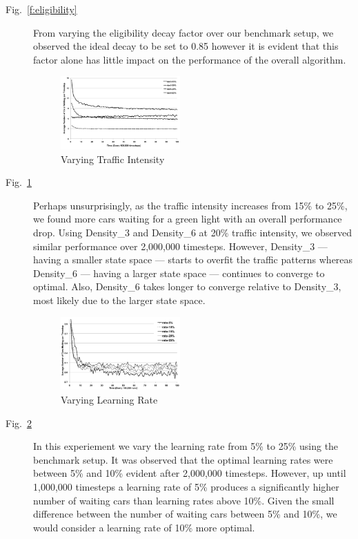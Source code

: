 \begin{description}
\item[Fig.~\ref{f:eligibility}] From varying the eligibility decay factor over
our benchmark setup, we observed the ideal decay to be set to 0.85 however it is
evident that this factor alone has little impact on the performance of the
overall algorithm.

\begin{figure}
\centering
\includegraphics[width=0.45\textwidth]{intensity}
\caption{Varying Traffic Intensity}\label{f:intensity}
\end{figure}

\item[Fig.~\ref{f:intensity}] Perhaps unsurprisingly, as the traffic intensity
increases from 15\% to 25\%, we found more cars waiting for a green light with
an overall performance drop. Using Density\_3 and Density\_6 at 20\% traffic
intensity, we observed similar performance over 2,000,000 timesteps. However,
Density\_3 --- having a smaller state space --- starts to overfit the traffic
patterns whereas Density\_6 --- having a larger state space --- continues to
converge to optimal. Also, Density\_6 takes longer to converge relative to
Density\_3, most likely due to the larger state space.

\begin{figure}
\centering
\includegraphics[width=0.45\textwidth]{learningRate}
\caption{Varying Learning Rate}\label{f:learningRate}
\end{figure}

\item[Fig.~\ref{f:learningRate}] In this experiement we vary the learning rate
from 5\% to 25\% using the benchmark setup. It was observed that the optimal
learning rates were between 5\% and 10\% evident after 2,000,000 timesteps.
However, up until 1,000,000 timesteps a learning rate of 5\% produces a
significantly higher number of waiting cars than learning rates above 10\%.
Given the small difference between the number of waiting cars between 5\% and
10\%, we would consider a learning rate of 10\% more optimal.


\end{description}
